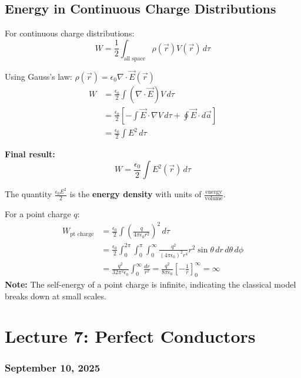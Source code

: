 \documentclass{article}
\begin{document}
\subsection{Energy in Continuous Charge Distributions}
For continuous charge distributions:
\begin{equation}
    W = \frac{1}{2} \int_{\text{all space}} \rho(\vec{r}) V(\vec{r}) \, d\tau
\end{equation}

Using Gauss's law: $\rho(\vec{r}) = \epsilon_0 \nabla \cdot \vec{E}(\vec{r})$
\begin{align}
    W &= \frac{\epsilon_0}{2} \int (\nabla \cdot \vec{E}) V \, d\tau \\
    &= \frac{\epsilon_0}{2} \left[ -\int \vec{E} \cdot \nabla V \, d\tau + \oint \vec{E} \cdot d\vec{a} \right] \\
    &= \frac{\epsilon_0}{2} \int E^2 \, d\tau
\end{align}

\textbf{Final result:}
\begin{equation}
    W = \frac{\epsilon_0}{2} \int E^2(\vec{r}) \, d\tau
\end{equation}

The quantity $\frac{\epsilon_0 E^2}{2}$ is the \textbf{energy density} with units of $\frac{\text{energy}}{\text{volume}}$.

For a point charge $q$:
\begin{align}
    W_{\text{pt charge}} &= \frac{\epsilon_0}{2} \int \left(\frac{q}{4\pi\epsilon_0 r^2}\right)^2 \, d\tau \\
    &= \frac{\epsilon_0}{2} \int_0^{2\pi} \int_0^{\pi} \int_0^{\infty} \frac{q^2}{(4\pi\epsilon_0)^2 r^4} r^2 \sin\theta \, dr \, d\theta \, d\phi \\
    &= \frac{q^2}{32\pi^2\epsilon_0} \int_0^{\infty} \frac{dr}{r^2} = \frac{q^2}{8\pi\epsilon_0} \left[-\frac{1}{r}\right]_0^{\infty} = \infty
\end{align}
\textbf{Note:} The self-energy of a point charge is infinite, indicating the classical model breaks down at small scales.


\newpage
\section{Lecture 7: Perfect Conductors}
\subsubsection*{September 10, 2025}
\end{document}
